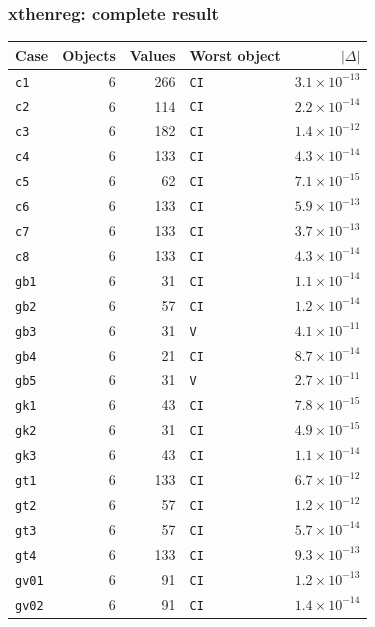 \documentclass[
  10.5pt,
  a4paper,
]{article}
\begin{document}
\subsubsection*{xthenreg: complete result}

\begin{longtable}{@{}p{3.6cm}rrp{4.9cm}r@{}}
\toprule
Case & Objects & Values & Worst object & $|\Delta|$ \\
\midrule
\endhead
\texttt{c1} & 6 & 266 & \texttt{CI} & $3.1\times10^{-13}$ \\
\texttt{c2} & 6 & 114 & \texttt{CI} & $2.2\times10^{-14}$ \\
\texttt{c3} & 6 & 182 & \texttt{CI} & $1.4\times10^{-12}$ \\
\texttt{c4} & 6 & 133 & \texttt{CI} & $4.3\times10^{-14}$ \\
\texttt{c5} & 6 & 62 & \texttt{CI} & $7.1\times10^{-15}$ \\
\texttt{c6} & 6 & 133 & \texttt{CI} & $5.9\times10^{-13}$ \\
\texttt{c7} & 6 & 133 & \texttt{CI} & $3.7\times10^{-13}$ \\
\texttt{c8} & 6 & 133 & \texttt{CI} & $4.3\times10^{-14}$ \\
\texttt{gb1} & 6 & 31 & \texttt{CI} & $1.1\times10^{-14}$ \\
\texttt{gb2} & 6 & 57 & \texttt{CI} & $1.2\times10^{-14}$ \\
\texttt{gb3} & 6 & 31 & \texttt{V} & $4.1\times10^{-11}$ \\
\texttt{gb4} & 6 & 21 & \texttt{CI} & $8.7\times10^{-14}$ \\
\texttt{gb5} & 6 & 31 & \texttt{V} & $2.7\times10^{-11}$ \\
\texttt{gk1} & 6 & 43 & \texttt{CI} & $7.8\times10^{-15}$ \\
\texttt{gk2} & 6 & 31 & \texttt{CI} & $4.9\times10^{-15}$ \\
\texttt{gk3} & 6 & 43 & \texttt{CI} & $1.1\times10^{-14}$ \\
\texttt{gt1} & 6 & 133 & \texttt{CI} & $6.7\times10^{-12}$ \\
\texttt{gt2} & 6 & 57 & \texttt{CI} & $1.2\times10^{-12}$ \\
\texttt{gt3} & 6 & 57 & \texttt{CI} & $5.7\times10^{-14}$ \\
\texttt{gt4} & 6 & 133 & \texttt{CI} & $9.3\times10^{-13}$ \\
\texttt{gv01} & 6 & 91 & \texttt{CI} & $1.2\times10^{-13}$ \\
\texttt{gv02} & 6 & 91 & \texttt{CI} & $1.4\times10^{-14}$ \\

\end{longtable}
\end{document}
